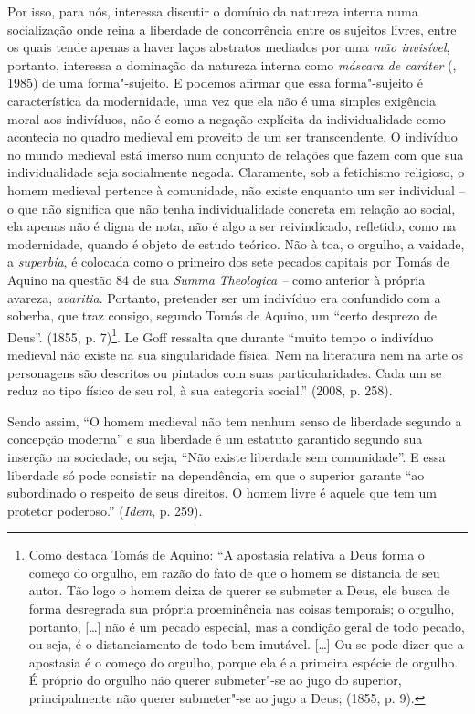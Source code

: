 Por isso, para nós, interessa discutir o domínio da natureza interna
numa socialização onde reina a liberdade de concorrência entre os
sujeitos livres, entre os quais tende apenas a haver laços abstratos
mediados por uma \emph{mão invisível}, portanto, interessa a dominação
da natureza interna como \emph{máscara de caráter} (, 1985) de uma
forma"-sujeito. E podemos afirmar que essa forma"-sujeito é característica
da modernidade, uma vez que ela não é uma simples exigência moral aos
indivíduos, não é como a negação explícita da individualidade como
acontecia no quadro medieval em proveito de um ser transcendente. O
indivíduo no mundo medieval está imerso num conjunto de relações que
fazem com que sua individualidade seja socialmente negada. Claramente,
sob a fetichismo religioso, o homem medieval pertence à comunidade, não
existe enquanto um ser individual -- o que não significa que não tenha
individualidade concreta em relação ao social, ela apenas não é digna de
nota, não é algo a ser reivindicado, refletido, como na modernidade,
quando é objeto de estudo teórico. Não à toa, o orgulho, a vaidade, a
\emph{superbia}, é colocada como o primeiro dos sete pecados capitais
por Tomás de Aquino na questão 84 de sua \emph{Summa} \emph{Theologica
--} como anterior à própria avareza, \emph{avaritia}. Portanto,
pretender ser um indivíduo era confundido com a soberba, que traz
consigo, segundo Tomás de Aquino, um ``certo desprezo de Deus''. (1855,
p. 7)\footnote{Como destaca Tomás de Aquino: ``A apostasia relativa a
  Deus forma o começo do orgulho, em razão do fato de que o homem se
  distancia de seu autor. Tão logo o homem deixa de querer se submeter a
  Deus, ele busca de forma desregrada sua própria proeminência nas
  coisas temporais; o orgulho, portanto, [\ldots{}] não é um pecado
  especial, mas a condição geral de todo pecado, ou seja, é o
  distanciamento de todo bem imutável. [\ldots{}] Ou se pode dizer
  que a apostasia é o começo do orgulho, porque ela é a primeira espécie
  de orgulho. É próprio do orgulho não querer submeter"-se ao jugo do
  superior, principalmente não querer submeter"-se ao jugo a Deus; (1855,
  p. 9).}. Le Goff ressalta que durante ``muito tempo o indivíduo
medieval não existe na sua singularidade física. Nem na literatura nem
na arte os personagens são descritos ou pintados com suas
particularidades. Cada um se reduz ao tipo físico de seu rol, à sua
categoria social.'' (2008, p. 258).

Sendo assim, ``O homem medieval não tem nenhum senso de liberdade
segundo a concepção moderna'' e sua liberdade é um estatuto garantido
segundo sua inserção na sociedade, ou seja, ``Não existe liberdade sem
comunidade''. E essa liberdade só pode consistir na dependência, em que
o superior garante ``ao subordinado o respeito de seus direitos. O homem
livre é aquele que tem um protetor poderoso.'' (\emph{Idem}, p. 259).

